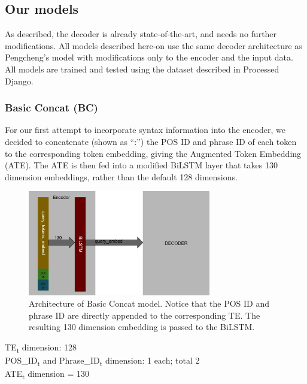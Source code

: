 \documentclass{IEEEtran}
\begin{document}
      \subsection{Our models}
      As described, the decoder is already state-of-the-art, and needs no further 
      modifications. All models described here-on use the same decoder architecture as Pengcheng's 
      model with modifications only to the encoder and the input data. All models are 
      trained and tested using the dataset described in Processed Django. \\

        \subsubsection{Basic Concat (BC)}
        For our first attempt to incorporate syntax information into the encoder, we decided to 
        concatenate (shown as ``:'') the POS ID and phrase ID of each token to the corresponding 
        token embedding, giving the Augmented Token Embedding (ATE). The ATE is then fed into 
        a modified BiLSTM layer that takes 130 dimension embeddings, rather than the default 128 
        dimensions. \\

        \begin{figure}[h]
          \centering
          \includegraphics[width=8cm]{bc.png}
          \caption{Architecture of Basic Concat model. Notice that the POS ID and phrase ID
          are directly appended to the corresponding TE. The resulting 130 dimension embedding
          is passed to the BiLSTM.}
          \label{fig:bc}
        \end{figure}

        \hspace*{-3.5mm}TE\textsubscript{t} dimension: 128 \\
        POS\_ID\textsubscript{t} and Phrase\_ID\textsubscript{t} dimension: 1 each; total 2 \\
        ATE\textsubscript{t} dimension = 130 \\
\end{document}
